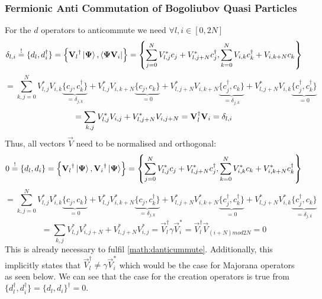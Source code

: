 \documentclass[Master]{subfiles}
\begin{document}
\subsubsection{Fermionic Anti Commutation of Bogoliubov Quasi Particles}\label{sec:Fermionicness}
For the $d$ operators to anticommute we need $\forall l,i \in [0, 2N]$
$$
\delta_{l,i}  \stackrel{!}{=} \{d_l,d^{\dag}_i\} =\left\{  {\mathbf{V}_l}^{\dag} \ket{\mathbf{\Psi}} ,\bra{\mathbf{\Psi}{\mathbf{V}_i}} \right\} 
= \left\{ \sum_{j=0}^N  V^*_{l,j} c_j +  V^*_{l,j+N} c^{\dag}_j, \sum_{k=0}^N  V_{i,k} c^{\dag}_k +  V_{i,k+N} c_k \right\} $$
$$
= \sum_{k,j = 0}^N
V^*_{l,j}V_{i,k} \underbrace{\{c_j,c^{\dag}_k\}}_{=\delta_{j,k}} 
+ V^*_{l,j}V_{i,k+N} \underbrace{\{c_j,c_k\}}_{=0} 
+ V^*_{l,j+N}V_{i,k+N} \underbrace{\{c_j^{\dag},c_k\}}_{=\delta_{j,k}} 
+ V^*_{l,j+N}V_{i,k} \underbrace{\{c_j^{\dag},c^{\dag}_k\}}_{=0}
$$
\begin{dmath}\label{math:danticummute}
{= \sum_{k,j} V^*_{l,j}V_{i,j} + V^*_{l,j+N}V_{i,j+N} = \vec{V}^{\dag}_l\vec{V}_i = \delta_{l,i} }\\
\end{dmath}
Thus, all vectors $\vec{V}$ need to be normalised and orthogonal:
$$0 \stackrel{!}{=} \{d_l,d_i\}  =\left\{  {\mathbf{V}_l}^{\dag} \ket{\mathbf{\Psi}} ,{\mathbf{V}_i}^{\dag}\ket{\mathbf{\Psi}} \right\} 
= \left\{ \sum_{j=0}^N  V^*_{l,j} c_j +  V^*_{l,j+N} c^{\dag}_j, \sum_{k=0}^N  V^*_{i,k} c_k +  V^*_{i,k+N} c^{\dag}_k \right\} $$
$$
= \sum_{k,j = 0}^N
V^*_{l,j}V^*_{i,k} \underbrace{\{c_j,c_k\}}_{=0} 
+ V^*_{l,j}V^*_{i,k+N} \underbrace{\{c_j,c_k^{\dag}\}}_{=\delta_{j,k}} 
+ V^*_{l,j+N}V^*_{i,k+N} \underbrace{\{c_j^{\dag},c_k^{\dag}\}}_{=0} 
+ V^*_{l,j+N}V^*_{i,k} \underbrace{\{c_j^{\dag},c_k\}}_{=\delta_{j,k}}
$$
$$
= \sum_{k,j} V^*_{l,j}V^*_{i,j+N} + V^*_{l,j+N}V^*_{i,j} = \vec{V}^{\dag}_l\gamma\vec{V}^*_i 
= \vec{V}^{\dag}_l \vec{V}_{(i+N )mod 2N} = 0 
$$ 
This is already necessary to fulfil \eqref{math:danticummute}. Additionally, this implicitly states that $\vec{V}^{\dag}_l\neq\gamma\vec{V}^*_i$ which would be the case for Majorana operators as seen below. 
We can see that the case for the creation operators is true from $\{d_l^{\dag},d_i^{\dag}\} = \{d_l,d_i\}^{\dag} =  0 $.
\end{document}
